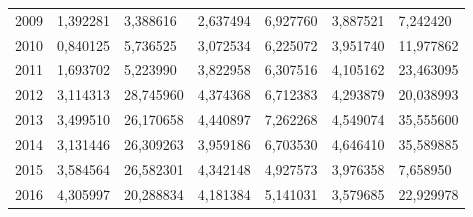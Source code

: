 \begin{table}
\begin{tabular}{p{1cm}p{2cm}p{2cm}p{2cm}p{2cm}p{2cm}p{2cm}}
 2009 &                                          1,392281 &         3,388616 &                                           2,637494 &          6,927760 &               3,887521 &                               7,242420 \\
 2010 &                                          0,840125 &         5,736525 &                                           3,072534 &          6,225072 &               3,951740 &                              11,977862 \\
 2011 &                                          1,693702 &         5,223990 &                                           3,822958 &          6,307516 &               4,105162 &                              23,463095 \\
 2012 &                                          3,114313 &        28,745960 &                                           4,374368 &          6,712383 &               4,293879 &                              20,038993 \\
 2013 &                                          3,499510 &        26,170658 &                                           4,440897 &          7,262268 &               4,549074 &                              35,555600 \\
 2014 &                                          3,131446 &        26,309263 &                                           3,959186 &          6,703530 &               4,646410 &                              35,589885 \\
 2015 &                                          3,584564 &        26,582301 &                                           4,342148 &          4,927573 &               3,976358 &                               7,658950 \\
 2016 &                                          4,305997 &        20,288834 &                                           4,181384 &          5,141031 &               3,579685 &                              22,929978 \\
\bottomrule
\end{tabular}
\end{table}
